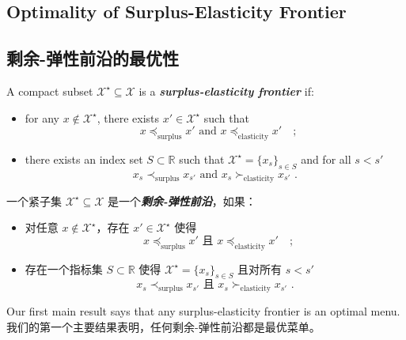 \documentclass[12pt,letterpaper]{article}
\newenvironment{original}{\color{black}\noindent}{}
\newenvironment{translation}{\color{blue}\noindent}{}
\theoremstyle{plain}
\theoremstyle{definition}
\theoremstyle{remark}
\newcommand{\R}{\mathds{R}}
\renewcommand{\1}{\mathds{1}}
\newcommand{\X}{\mathcal{X}}
\theoremstyle{definition}
\begin{document}
\begin{original}
\subsection{Optimality of Surplus-Elasticity Frontier}
\end{original}
\begin{translation}
\subsection{剩余-弹性前沿的最优性}
\end{translation}

\begin{original}
A compact subset $\mathcal{X}^\star \subseteq \mathcal{X}$ is a \textit{\textbf{surplus-elasticity frontier}} if:
\begin{itemize}
    \item[\textit{(i)}] for any $x \not\in \mathcal{X}^\star$, there exists $x' \in \mathcal{X}^\star$ such that
    \[\text{ $x \preceq_{\text{surplus}} x'$ and $x \preceq_{\text{elasticity}} x'$ } \,\,;\]
    \item[\textit{(ii)}] there exists an index set $S\subset \R$ such that $\X^\star = \{x_s\}_{s\in S}$ and for all $s < s'$
    \[x_{s} \prec_{\text{surplus}} x_{s'} \text{ and } x_{s} \succ_{\text{elasticity}} x_{s'}\,\,.\]
\end{itemize}
\end{original}
\begin{translation}
一个紧子集 $\mathcal{X}^\star \subseteq \mathcal{X}$ 是一个\textit{\textbf{剩余-弹性前沿}}，如果：
\begin{itemize}
    \item[\textit{(i)}] 对任意 $x \not\in \mathcal{X}^\star$，存在 $x' \in \mathcal{X}^\star$ 使得
    \[\text{ $x \preceq_{\text{surplus}} x'$ 且 $x \preceq_{\text{elasticity}} x'$ } \,\,;\]
    \item[\textit{(ii)}] 存在一个指标集 $S\subset \R$ 使得 $\X^\star = \{x_s\}_{s\in S}$ 且对所有 $s < s'$
    \[x_{s} \prec_{\text{surplus}} x_{s'} \text{ 且 } x_{s} \succ_{\text{elasticity}} x_{s'}\,\,.\]
\end{itemize}
\end{translation}

\begin{original}
Our first main result says that any surplus-elasticity frontier is an optimal menu.
\end{original}
\begin{translation}
我们的第一个主要结果表明，任何剩余-弹性前沿都是最优菜单。
\end{translation}
\end{document}
